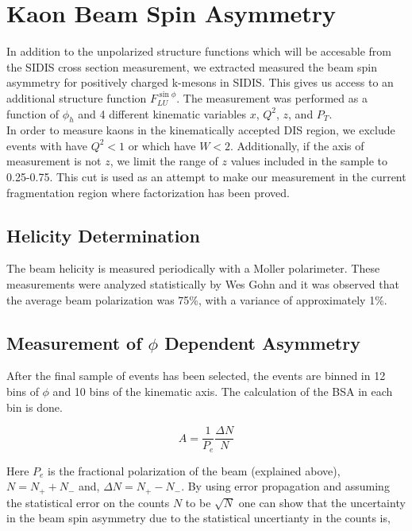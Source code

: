 \section{Kaon Beam Spin Asymmetry}

In addition to the unpolarized structure functions which will be accesable from the SIDIS cross section measurement, we extracted measured the beam spin asymmetry for positively charged k-mesons in SIDIS.  This gives us access to an additional structure function $F_{LU}^{\sin\phi}$.  The measurement was performed as a function of $\phi_h$ and 4 different kinematic variables $x$, $Q^2$, $z$, and $P_T$.  \\

In order to measure kaons in the kinematically accepted DIS region, we exclude events with have $Q^2 < 1$ or which have $W < 2$.  Additionally, if the axis of measurement is not $z$, we limit the range of $z$ values included in the sample to 0.25-0.75.  This cut is used as an attempt to make our measurement in the current fragmentation region where factorization has been proved.  

\subsection{Helicity Determination}
The beam helicity is measured periodically with a Moller polarimeter.  These measurements were analyzed statistically by Wes Gohn and it was observed that the average beam polarization was 75\%, with a variance of approximately 1\%.  

\subsection{Measurement of $\phi$ Dependent Asymmetry}
After the final sample of events has been selected, the events are binned in 12 bins of $\phi$ and 10 bins of the kinematic axis.  The calculation of the BSA in each bin is done.

\begin{equation}
  A = \frac{1}{P_e} \frac{\Delta N}{N}
\end{equation}

Here $P_e$ is the fractional polarization of the beam (explained above), $N = N_+ + N_-$ and, $\Delta N = N_+ - N_-$.  By using error propagation and assuming the statistical error on the counts $N$ to be $\sqrt{N}$ one can show that the uncertainty in the beam spin asymmetry due to the statistical uncertianty in the counts is,

